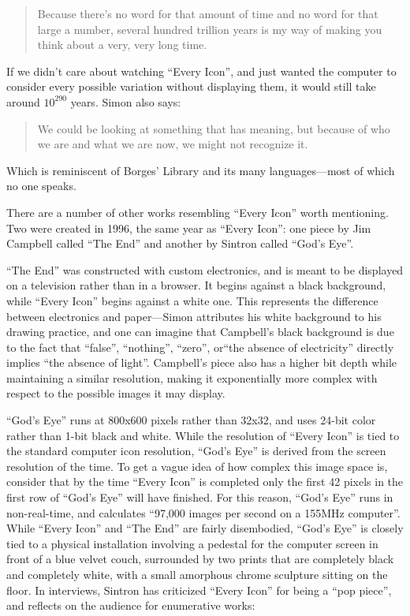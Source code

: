 \documentclass{thesis}
\begin{document}
	\begin{quote}
	Because there's no word for that amount of time and no word for that large a number, several hundred trillion years is my way of making you think about a very, very long time.
	\end{quote}
	
	If we didn't care about watching ``Every Icon'', and just wanted the computer to consider every possible variation without displaying them, it would still take around $10^{290}$ years. Simon also says:
	
	\begin{quote}
	We could be looking at something that has meaning, but because of who we are and what we are now, we might not recognize it.
	\end{quote}
	
	Which is reminiscent of Borges' Library and its many languages---most of which no one speaks.
	
	There are a number of other works resembling ``Every Icon'' worth mentioning. Two were created in 1996, the same year as ``Every Icon'': one piece by Jim Campbell called ``The End''\cite{jim_campbell_end_1996} and another by Sintron called ``God's Eye''.\cite{sintron_gods_2003}
	
	``The End'' was constructed with custom electronics, and is meant to be displayed on a television rather than in a browser. It begins against a black background, while ``Every Icon'' begins against a white one. This represents the difference between electronics and paper---Simon attributes his white background to his drawing practice, and one can imagine that Campbell's black background is due to the fact that ``false'', ``nothing'', ``zero'',  or``the absence of electricity'' directly implies ``the absence of light''. Campbell's piece also has a higher bit depth while maintaining a similar resolution, making it exponentially more complex with respect to the possible images it may display.
	
	``God's Eye'' runs at 800x600 pixels rather than 32x32, and uses 24-bit color rather than 1-bit black and white. While the resolution of ``Every Icon'' is tied to the standard computer icon resolution, ``God's Eye'' is derived from the screen resolution of the time. To get a vague idea of how complex this image space is, consider that by the time ``Every Icon'' is completed only the first 42 pixels in the first row of ``God's Eye'' will have finished. For this reason, ``God's Eye'' runs in non-real-time, and calculates ``97,000 images per second on a 155MHz computer''. While ``Every Icon'' and ``The End'' are fairly disembodied, ``God's Eye'' is closely tied to a physical installation involving a pedestal for the computer screen in front of a blue velvet couch, surrounded by two prints that are completely black and completely white, with a small amorphous chrome sculpture sitting on the floor. In interviews, Sintron has criticized ``Every Icon'' for being a ``pop piece''\cite{olga_goriunova_and_alexei_shulgin_touching_2003}, and reflects on the audience for enumerative works:
	
\end{document}

